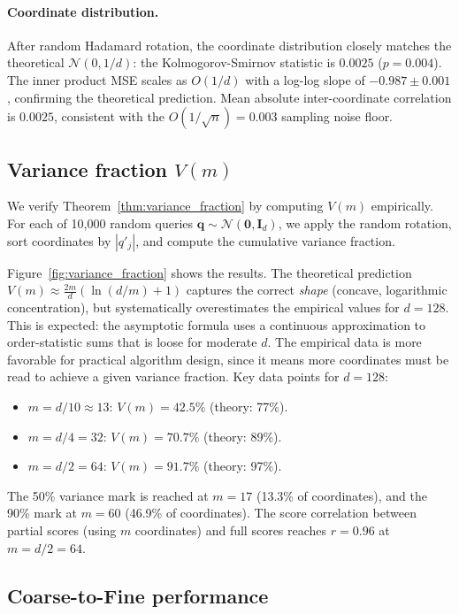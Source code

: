 \documentclass[10pt,twocolumn]{article}
\theoremstyle{definition}
\newcommand{\calN}{\mathcal{N}}
\newcommand{\bq}{\mathbf{q}}
\begin{document}
\paragraph{Coordinate distribution.}
After random Hadamard rotation, the coordinate distribution closely matches the
theoretical $\calN(0, 1/d)$: the Kolmogorov-Smirnov statistic is $0.0025$
($p = 0.004$).  The inner product MSE scales as $O(1/d)$ with a log-log slope
of $-0.987 \pm 0.001$, confirming the theoretical prediction.  Mean absolute
inter-coordinate correlation is $0.0025$, consistent with the
$O(1/\sqrt{n}) = 0.003$ sampling noise floor.

\subsection{Variance fraction $V(m)$}
\label{sec:exp_variance}

We verify Theorem~\ref{thm:variance_fraction} by computing $V(m)$ empirically.
For each of 10{,}000 random queries $\bq \sim \calN(\mathbf{0}, \mathbf{I}_d)$,
we apply the random rotation, sort coordinates by $|q'_j|$, and compute the
cumulative variance fraction.

Figure~\ref{fig:variance_fraction} shows the results.  The theoretical
prediction $V(m) \approx \frac{2m}{d}(\ln(d/m) + 1)$ captures the correct
\emph{shape} (concave, logarithmic concentration), but systematically
overestimates the empirical values for $d = 128$.  This is expected: the
asymptotic formula uses a continuous approximation to order-statistic sums
that is loose for moderate $d$.  The empirical data is more favorable for
practical algorithm design, since it means more coordinates must be read to
achieve a given variance fraction.  Key data points for $d = 128$:
\begin{itemize}[nosep]
  \item $m = d/10 \approx 13$: $V(m) = 42.5\%$ (theory: 77\%).
  \item $m = d/4 = 32$: $V(m) = 70.7\%$ (theory: 89\%).
  \item $m = d/2 = 64$: $V(m) = 91.7\%$ (theory: 97\%).
\end{itemize}
The 50\% variance mark is reached at $m = 17$ (13.3\% of coordinates), and the
90\% mark at $m = 60$ (46.9\% of coordinates).  The score correlation between
partial scores (using $m$ coordinates) and full scores reaches $r = 0.96$ at
$m = d/2 = 64$.

\subsection{Coarse-to-Fine performance}
\label{sec:exp_c2f}
\end{document}
